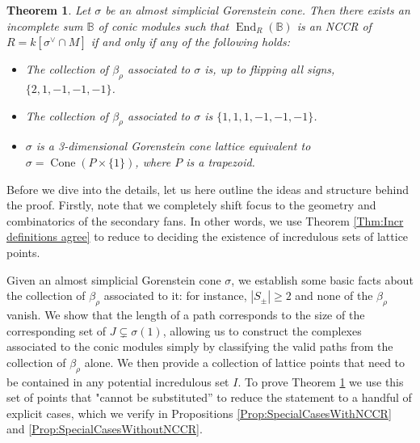 \documentclass[reqno, 12pt]{amsart}
\newtheorem{theorem}{Theorem}[section]
\theoremstyle{definition}
\numberwithin{equation}{section}
\newcommand{\End}{\operatorname{End}}
\newcommand{\cone}{\operatorname{Cone}}
\begin{document}
\begin{theorem}
    \label{Thm:AlmSimplConicNCCR}
    Let $\sigma$ be an almost simplicial  Gorenstein cone. Then there exists an incomplete sum $\mathbb{B}$ of conic modules such that $\End_{R}(\mathbb{B})$  is an NCCR of $R=k[\sigma^\vee\cap M]$ if and only if any of the following holds:
    \begin{itemize}
        \item The collection of $\beta_\rho$ associated to $\sigma$ is, up to flipping all signs, $\{2,1,-1,-1,-1\}$.
        \item The collection of $\beta_\rho$ associated to $\sigma$ is $\{1,1,1,-1,-1,-1\}$.
        \item $\sigma$ is a 3-dimensional Gorenstein cone lattice equivalent to $\sigma=\cone(P\times\{1\})$, where $P$ is a trapezoid. 
    \end{itemize}
\end{theorem}


Before we dive into the details, let us here outline the ideas and structure behind the proof. Firstly, note that we completely shift focus to the geometry and combinatorics of the secondary fans. In other words, we use Theorem \ref{Thm:Incr definitions agree} to reduce to deciding the existence of incredulous sets of lattice points. 

Given an almost simplicial Gorenstein cone $\sigma$,  we establish some basic facts about the collection of $\beta_\rho$ associated to it: for instance, $|S_\pm|\ge 2$ and none of the $\beta_\rho$ vanish. We show that the length of a path corresponds to the size of the corresponding set of $J\subsetneq \sigma(1)$, allowing us to construct the complexes associated to the conic modules simply by classifying the valid paths from the collection of $\beta_\rho$ alone. We then provide a collection of lattice points that need to be contained in any potential incredulous set $I$. To prove Theorem \ref{Thm:AlmSimplConicNCCR} we use this set of points that "cannot be substituted'' to reduce the statement to a handful of explicit cases, which we verify in Propositions \ref{Prop:SpecialCasesWithNCCR} and \ref{Prop:SpecialCasesWithoutNCCR}.
\end{document}
